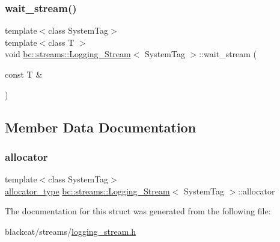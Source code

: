 \subsubsection{\texorpdfstring{wait\+\_\+stream()}{wait\_stream()}}
{\footnotesize\ttfamily template$<$class System\+Tag$>$ \\
template$<$class T $>$ \\
void \hyperlink{structbc_1_1streams_1_1Logging__Stream}{bc\+::streams\+::\+Logging\+\_\+\+Stream}$<$ System\+Tag $>$\+::wait\+\_\+stream (\begin{DoxyParamCaption}\item[{const T \&}]{ }\end{DoxyParamCaption})\hspace{0.3cm}{\ttfamily [inline]}}



\subsection{Member Data Documentation}
\mbox{\label{structbc_1_1streams_1_1Logging__Stream_a635c2bdad82fdd1ee9782c761a5c2131}} 
\subsubsection{\texorpdfstring{allocator}{allocator}}
{\footnotesize\ttfamily template$<$class System\+Tag$>$ \\
\hyperlink{structbc_1_1streams_1_1Logging__Stream_a8f20249b75af292f8b50c8bb09a82b38}{allocator\+\_\+type} \hyperlink{structbc_1_1streams_1_1Logging__Stream}{bc\+::streams\+::\+Logging\+\_\+\+Stream}$<$ System\+Tag $>$\+::allocator}



The documentation for this struct was generated from the following file\+:\begin{DoxyCompactItemize}
\item 
blackcat/streams/\hyperlink{logging__stream_8h}{logging\+\_\+stream.\+h}\end{DoxyCompactItemize}
